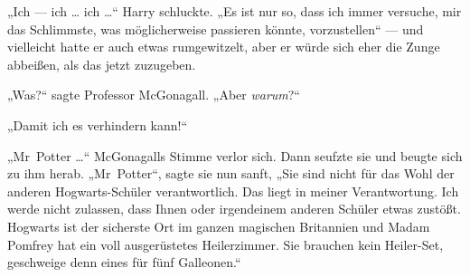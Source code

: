 
„Ich — ich … ich …“ Harry schluckte.
„Es ist nur so, dass ich immer versuche, mir das Schlimmste, was möglicherweise passieren könnte, vorzustellen“ — und vielleicht hatte er auch etwas rumgewitzelt, aber er würde sich eher die Zunge abbeißen, als das jetzt zuzugeben.

„Was?“ sagte Professor McGonagall.
„Aber \emph{warum}?“

„Damit ich es verhindern kann!“

„Mr~Potter …“ McGonagalls Stimme verlor sich. Dann seufzte sie und beugte sich zu ihm herab.
„Mr~Potter“, sagte sie nun sanft,
„Sie sind nicht für das Wohl der anderen Hogwarts-Schüler verantwortlich. Das liegt in meiner Verantwortung. Ich werde nicht zulassen, dass Ihnen oder irgendeinem anderen Schüler etwas zustößt. Hogwarts ist der sicherste Ort im ganzen magischen Britannien und Madam Pomfrey hat ein voll ausgerüstetes Heilerzimmer. Sie brauchen kein Heiler-Set, geschweige denn eines für fünf Galleonen.“

